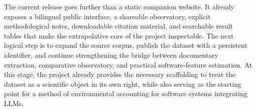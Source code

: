 \documentclass[11pt,a4paper]{article}
\begin{document}
The current release goes further than a static companion website. It already exposes a bilingual public interface, a shareable observatory, explicit methodological notes, downloadable citation material, and searchable result tables that make the extrapolative core of the project inspectable. The next logical step is to expand the source corpus, publish the dataset with a persistent identifier, and continue strengthening the bridge between documentary extraction, comparative observatory, and practical software-feature estimation. At this stage, the project already provides the necessary scaffolding to treat the dataset as a scientific object in its own right, while also serving as the starting point for a method of environmental accounting for software systems integrating LLMs.



\end{document}
